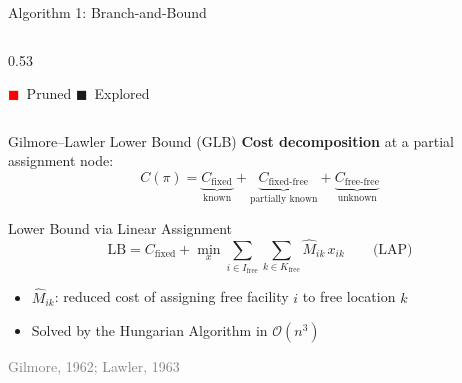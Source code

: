 \documentclass[aspectratio=169,11pt]{beamer}
\newcommand{\BigO}{\mathcal{O}}
\newcommand{\reference}[1]{\hfill{\scriptsize\textcolor{gray}{#1}}}
\begin{document}
\begin{frame}{Algorithm 1: Branch-and-Bound}
\begin{columns}[T]
\begin{column}{0.53\textwidth}

  \vspace{0.3em}
  {\scriptsize \textcolor{red}{$\blacksquare$}~Pruned \quad
               \textcolor{blue!60!black}{$\blacksquare$}~Explored}
\end{column}

\end{columns}

\end{frame}

\begin{frame}{Gilmore--Lawler Lower Bound (GLB)}
\textbf{Cost decomposition} at a partial assignment node:
\[
  C(\pi) = \underbrace{C_{\text{fixed}}}_{\text{known}}
  + \underbrace{C_{\text{fixed-free}}}_{\text{partially known}}
  + \underbrace{C_{\text{free-free}}}_{\text{unknown}}
\]

\vspace{6pt}
\begin{block}{Lower Bound via Linear Assignment}
\[
  \mathrm{LB} = C_{\text{fixed}}
  + \min_{x}\sum_{i\in I_{\text{free}}}\sum_{k\in K_{\text{free}}}
    \hat{M}_{ik}\,x_{ik}
  \qquad\text{(LAP)}
\]
\end{block}
\begin{itemize}
  \item $\hat{M}_{ik}$: reduced cost of assigning free facility $i$ to free location $k$
  \item Solved by the \alert{Hungarian Algorithm} in $\BigO(n^3)$
\end{itemize}
\vspace{4pt}
\reference{Gilmore, 1962; Lawler, 1963}
\end{frame}
\end{document}
